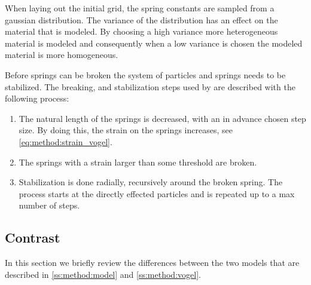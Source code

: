 When laying out the initial grid, the spring constants are sampled from a gaussian distribution. The variance of the distribution has an effect on the material that is modeled. By choosing a high variance more heterogeneous material is modeled and consequently when a low variance is chosen the modeled material is more homogeneous.

Before springs can be broken the system of particles and springs needs to be stabilized. The breaking, and stabilization steps used by \citeauthor{vogel2005studies2} are described with the following process:
\begin{enumerate}
	\item The natural length of the springs is decreased, with an in advance chosen step size. By doing this, the strain on the springs increases, see \eqref{eq:method:strain_vogel}.
	\item The springs with a strain larger than some threshold are broken.
	\item Stabilization is done radially, recursively around the broken spring. The process starts at the directly effected particles and is repeated up to a max number of steps. 
\end{enumerate}

\subsection{Contrast}\label{ss:method:contrast}

In this section we briefly review the differences between the two models that are described in \cref{ss:method:model} and \cref{ss:method:vogel}. 




